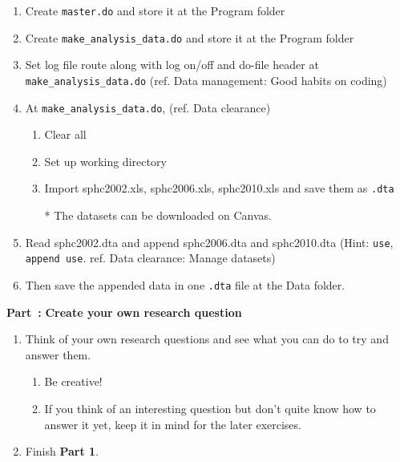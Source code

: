 \documentclass[11pt]{article}
\newcounter{Part}[section]
\newenvironment{Part}[1][]{\refstepcounter{Part}\par\medskip
   \noindent \large \textbf{Part~\thePart #1: }}{\medskip}
\begin{document}
\begin{enumerate} 
	\item Create \verb|master.do| and store it at the Program folder
	\item Create \verb|make_analysis_data.do| and store it at the Program folder
	\item Set log file route along with log on/off and do-file header at  \verb|make_analysis_data.do| (ref. Data management: Good habits on coding)
	\item At  \verb|make_analysis_data.do|, (ref. Data clearance)
	\begin{enumerate}
	\item Clear all
	\item Set up working directory 
	\item Import sphc2002.xls, sphc2006.xls, sphc2010.xls and save them as \verb|.dta|
	\item[*] The datasets can be downloaded on Canvas. 
	\end{enumerate}
	\item Read sphc2002.dta and append sphc2006.dta and sphc2010.dta (Hint: \verb|use|, \verb|append use|. ref. Data clearance: Manage datasets)
	\item Then save the appended data in one \verb|.dta| file at the Data folder.
\end{enumerate}

\begin{Part}
\textbf{Create your own research question}
\end{Part}

\begin{enumerate}
    \item Think of your own research questions and see what you can do to try and answer them. 
        \begin{enumerate}
            \item Be creative! 
            \item If you think of an interesting question but don't quite know how to answer it yet, keep it in mind for the later exercises.
        \end{enumerate}
    \item Finish \textbf{Part 1}.
\end{enumerate}
\end{document}
